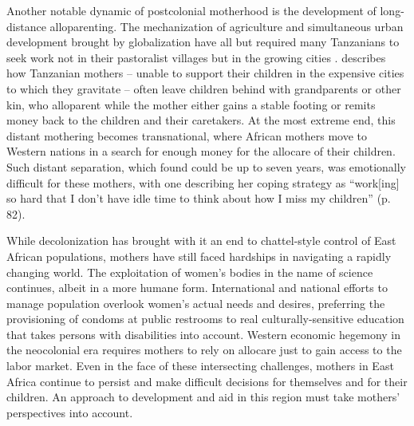 \documentclass[american]{../../../coursework}
\begin{document}
Another notable dynamic of postcolonial motherhood is the development of
long-distance alloparenting. The mechanization of agriculture and simultaneous
urban development brought by globalization have all but required many
Tanzanians to seek work not in their pastoralist villages but in the growing
cities \parencite{Coc19}. \textcite{Kyo15} describes how Tanzanian mothers --
unable to support their children in the expensive cities to which they
gravitate -- often leave children behind with grandparents or other kin, who
alloparent while the mother either gains a stable footing or remits money back
to the children and their caretakers. At the most extreme end, this distant
mothering becomes transnational, where African mothers move to Western nations
in a search for enough money for the allocare of their children. Such distant
separation, which \textcite{Kyo15} found could be up to seven years, was
emotionally difficult for these mothers, with one describing her coping
strategy as ``work[ing] so hard that I don't have idle time to think about how
I miss my children'' (p. 82).

While decolonization has brought with it an end to chattel-style control of
East African populations, mothers have still faced hardships in navigating a
rapidly changing world. The exploitation of women's bodies in the name of
science continues, albeit in a more humane form. International and national
efforts to manage population overlook women's actual needs and desires,
preferring the provisioning of condoms at public restrooms to real
culturally-sensitive education that takes persons with disabilities into
account. Western economic hegemony in the neocolonial era requires mothers to
rely on allocare just to gain access to the labor market. Even in the face of
these intersecting challenges, mothers in East Africa continue to persist and
make difficult decisions for themselves and for their children. An approach to
development and aid in this region must take mothers' perspectives into
account.

\printbibliography
\end{document}
